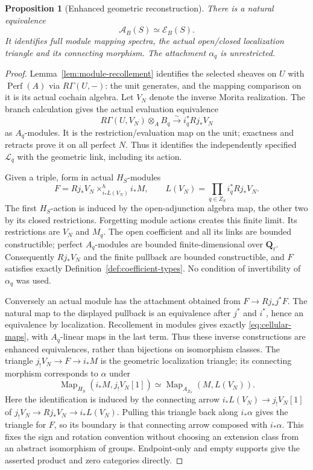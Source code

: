 \documentclass[11pt]{article}
\newtheorem{proposition}{Proposition}[section]
\theoremstyle{definition}
\theoremstyle{remark}
\newcommand{\Q}{\mathbf Q_\ell}
\newcommand{\Perf}{\operatorname{Perf}}
\begin{document}
\begin{proposition}[Enhanced geometric reconstruction]\label{thm:cellular-reconstruction}
There is a natural equivalence
\[
 \mathcal A_B(S)\simeq\mathcal E_B(S).
\]
It identifies full module mapping spectra, the actual open/closed
localization triangle and its connecting morphism.  The attachment
$\alpha_q$ is unrestricted.
\end{proposition}
\begin{proof}
Lemma~\ref{lem:module-recollement} identifies the selected sheaves
on $U$
with $\Perf(A)$ via $R\Gamma(U,-)$: the unit generates, and the
mapping comparison on it is its actual cochain algebra.  Let $V_N$
denote the inverse Morita realization.  The branch calculation gives
the actual evaluation equivalence
\[
 R\Gamma(U,V_N)\otimes_A B_q\xrightarrow{\sim}i_q^*Rj_*V_N
\]
as $A_q$-modules.  It is the restriction/evaluation map on the unit;
exactness and retracts prove it on all perfect $N$.  Thus it
identifies the independently specified $\mathcal L_q$ with the
geometric link, including its action.

Given a triple, form in actual $H_S$-modules
\[
 F=Rj_*V_N\mathop{\times}^{h}_{i_*L(V_N)}i_*M,
 \qquad L(V_N)=\prod_{q\in Z_S}i_q^*Rj_*V_N.
\]
The first $H_S$-action is induced by the open-adjunction algebra map,
the other two by its closed restrictions.  Forgetting module actions
creates this finite limit.  Its restrictions are $V_N$ and $M_q$.
The open coefficient and all its links are bounded constructible;
perfect $A_q$-modules are bounded finite-dimensional over $\Q$.
Consequently $Rj_*V_N$ and the finite pullback are bounded
constructible, and $F$ satisfies exactly Definition~\ref{def:coefficient-types}.
No condition of invertibility of $\alpha_q$ was used.

Conversely an actual module has the attachment obtained from
$F\to Rj_*j^*F$.  The natural map to the displayed pullback is an
equivalence after $j^*$ and $i^*$, hence an equivalence by
localization.  Recollement in modules gives exactly
\eqref{eq:cellular-maps}, with $A_q$-linear maps in the last term.
Thus these inverse constructions are enhanced equivalences, rather
than bijections on isomorphism classes.
The triangle $j_!V_N\to F\to i_*M$ is the geometric localization
triangle; its connecting morphism corresponds to $\alpha$ under
\[
 \operatorname{Map}_{H_S}(i_*M,j_!V_N[1])
       \simeq\operatorname{Map}_{A_{Z_S}}(M,L(V_N)).
\]
Here the identification is induced by the connecting arrow
$i_*L(V_N)\to j_!V_N[1]$ of
$j_!V_N\to Rj_*V_N\to i_*L(V_N)$.  Pulling this triangle back
along $i_*\alpha$ gives the triangle for $F$, so its boundary is
that connecting arrow composed with $i_*\alpha$.  This fixes the
sign and rotation convention without choosing an extension class
from an abstract isomorphism of groups.
Endpoint-only and empty supports give the asserted product and zero
categories directly.
\end{proof}
\end{document}
